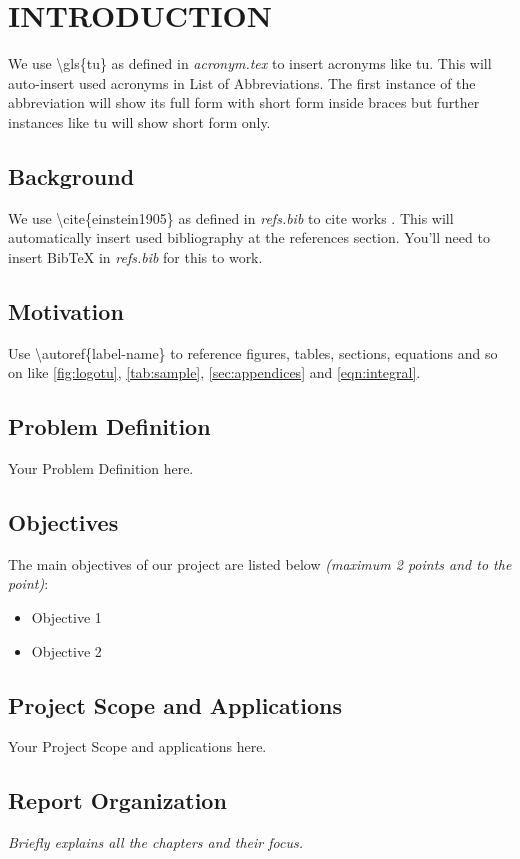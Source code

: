 \documentclass{ioereport}
\begin{document}
\mainsection

\section{\MakeUppercase{Introduction}}
    We use \textbackslash gls\{tu\} as defined in \textit{acronym.tex} to insert acronyms like \gls{tu}. This will auto-insert used acronyms in List of Abbreviations. The first instance of the abbreviation will show its full form with short form inside braces but further instances like \gls{tu} will show short form only.
    \subsection{Background}
    We use \textbackslash cite\{einstein1905\} as defined in \textit{refs.bib} to cite works \cite{einstein1905}. This will automatically insert used bibliography at the references section. You'll need to insert BibTeX in \textit{refs.bib} for this to work.
    \subsection{Motivation}
    Use \textbackslash autoref\{label-name\} to reference figures, tables, sections, equations and so on like \autoref{fig:logotu}, \autoref{tab:sample}, \autoref{sec:appendices} and \autoref{eqn:integral}.
    \subsection{Problem Definition}
    Your Problem Definition here.
    \subsection{Objectives}
    The main objectives of our project are listed below \textit{(maximum 2 points and to the point)}:
    \begin{itemize}
        \item Objective 1
        \item Objective 2
    \end{itemize}
    
    \subsection{Project Scope and Applications}
    Your Project Scope and applications here.
    \subsection{Report Organization}
    \textit{Briefly explains all the chapters and their focus.}
\end{document}
